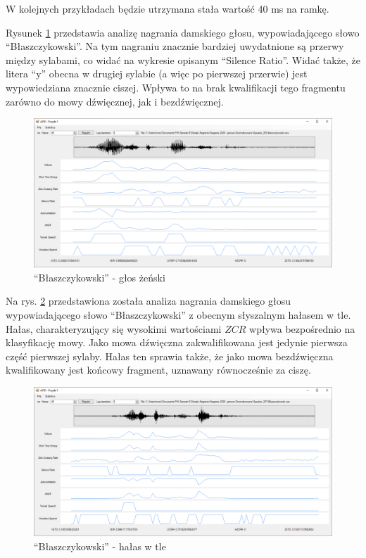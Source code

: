 \documentclass[12pt,a4paper]{article}
\begin{document}
W kolejnych przykładach będzie utrzymana stała wartość 40 ms na ramkę.

Rysunek \ref{fig:blaszczykowski_f} przedstawia analizę nagrania damskiego głosu, wypowiadającego
słowo ``Błaszczykowski''. Na tym nagraniu znacznie bardziej uwydatnione są przerwy między sylabami,
co widać na wykresie opisanym ``Silence Ratio''. Widać także, że litera ``y'' obecna w drugiej
sylabie (a więc po pierwszej przerwie) jest wypowiedziana znacznie ciszej. Wpływa to na brak
kwalifikacji tego fragmentu zarówno do mowy dźwięcznej, jak i bezdźwięcznej.

\begin{figure}[h!]
\centering
\includegraphics[width=1.0\textwidth]{figures/blasczykowski_f}
\caption{``Błaszczykowski'' - głos żeński}
\label{fig:blaszczykowski_f}
\end{figure}

Na rys. \ref{fig:blaszczykowski_noisy} przedstawiona została analiza nagrania damskiego głosu
wypowiadającego słowo ``Błaszczykowski'' z obecnym słyszalnym hałasem w tle. Hałas, charakteryzujący
się wysokimi wartościami $ZCR$ wpływa bezpośrednio na klasyfikację mowy. Jako mowa dźwięczna
zakwalifikowana jest jedynie pierwsza część pierwszej sylaby. Hałas ten sprawia także, że jako mowa
bezdźwięczna kwalifikowany jest końcowy fragment, uznawany równocześnie za ciszę.

\begin{figure}[h!]
\centering
\includegraphics[width=1.0\textwidth]{figures/blasczykowski_noisy}
\caption{``Błaszczykowski'' - hałas w tle}
\label{fig:blaszczykowski_noisy}
\end{figure}
\end{document}
